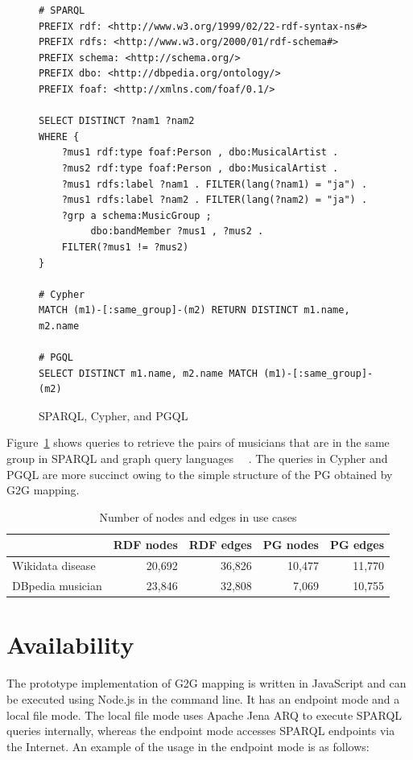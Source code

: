 \documentclass[runningheads]{llncs}
\begin{document}
\begin{figure}[!t]
\vspace{2mm}
\begin{scriptsize}
\begin{verbatim}
# SPARQL
PREFIX rdf: <http://www.w3.org/1999/02/22-rdf-syntax-ns#>
PREFIX rdfs: <http://www.w3.org/2000/01/rdf-schema#>
PREFIX schema: <http://schema.org/>
PREFIX dbo: <http://dbpedia.org/ontology/>
PREFIX foaf: <http://xmlns.com/foaf/0.1/>
 
SELECT DISTINCT ?nam1 ?nam2
WHERE {
    ?mus1 rdf:type foaf:Person , dbo:MusicalArtist .
    ?mus2 rdf:type foaf:Person , dbo:MusicalArtist .
    ?mus1 rdfs:label ?nam1 . FILTER(lang(?nam1) = "ja") .
    ?mus1 rdfs:label ?nam2 . FILTER(lang(?nam2) = "ja") .
    ?grp a schema:MusicGroup ;
         dbo:bandMember ?mus1 , ?mus2 .
    FILTER(?mus1 != ?mus2)
}

# Cypher
MATCH (m1)-[:same_group]-(m2) RETURN DISTINCT m1.name, m2.name

# PGQL
SELECT DISTINCT m1.name, m2.name MATCH (m1)-[:same_group]-(m2)
\end{verbatim}
\end{scriptsize}
\caption{SPARQL, Cypher, and PGQL}
\label{fig:sparql}
\end{figure}
 
Figure~\ref{fig:sparql} shows queries to retrieve the pairs of musicians that are in the same group in SPARQL and graph query languages ~\cite{openCypher}~\cite{pgql}. The queries in Cypher and PGQL are more succinct owing to the simple structure of the PG obtained by G2G mapping.

\begin{table}[h]
    \centering
    \begin{tabular}{l|r|r|r|r}
        \hline
        & RDF nodes & RDF edges & PG nodes & PG edges \\
        \hline
        Wikidata disease & 20,692 & 36,826 & 10,477 & 11,770 \\
        DBpedia musician & 23,846 & 32,808 & 7,069 & 10,755 \\
        \hline
    \end{tabular}
    \caption{Number of nodes and edges in use cases}
    \label{table:numbers}
\end{table}


\section{Availability}
The prototype implementation of G2G mapping is written in JavaScript and can be executed using Node.js in the command line. It has an endpoint mode and a local file mode. The local file mode uses Apache Jena ARQ to execute SPARQL queries internally, whereas the endpoint mode accesses SPARQL endpoints via the Internet. An example of the usage in the endpoint mode is as follows:
\end{document}
